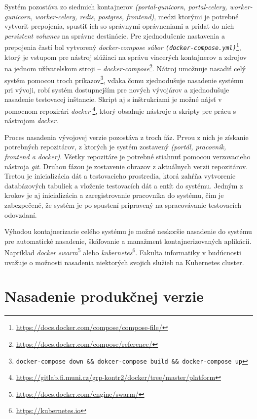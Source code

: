 \documentclass[
  digital, %
  twoside, %
  table,   %
  lof,     %
  lot,     %
]{fithesis3}
\begin{document}
Systém pozostáva zo siedmich kontajnerov \emph{(portal-gunicorn, portal-celery, worker-gunicorn, worker-celery, redis, postgres, frontend)}, medzi ktorými je potrebné vytvoriť prepojenia, spustiť ich so správnymi oprávneniami a pridať do nich \emph{persistent volumes} na správne destinácie. Pre zjednodušenie nastavenia a prepojenia častí bol vytvorený \emph{docker-compose súbor \texttt{(docker-compose.yml)}}\footnote{\url{https://docs.docker.com/compose/compose-file/}}, ktorý je vstupom pre nástroj slúžiaci na správu viacerých kontajnerov a zdrojov na jednom užívatelskom stroji -- \emph{docker-compose}\footnote{\url{https://docs.docker.com/compose/reference/}}. Nátroj umožnuje nasadiť celý systém pomocou troch príkazov\footnote{\texttt{docker-compose down \&\& dokcer-compose build \&\& docker-compose up}}, vďaka čomu zjednodušuje nasadenie systému pri vývoji, robí systém dostupnejším pre nových vývojárov a zjednodušuje nasadenie testovacej inštancie. Skript aj s inštrukciami je možné nájsť v pomocnom repozirári \emph{docker} \footnote{\url{https://gitlab.fi.muni.cz/grp-kontr2/docker/tree/master/platform}}, ktorý obsahuje nástroje a skripty pre prácu s nástrojom \emph{docker}.

Proces nasadenia vývojovej verzie pozostáva z troch fáz. Prvou z nich je získanie potrebných repozitárov, z ktorých je systém zostavený \emph{(portál, pracovník, frontend a docker)}. Všetky repozitáre je potrebné stiahnuť pomocou verzovacieho nástroja \emph{git}. Druhou fázou je zostavenie obrazov z aktuálnych verzii repozitárov. Tretou je inicializácia dát a testovacieho prostredia, ktorá zahŕňa vytvorenie databázových tabuliek a vloženie testovacích dát a entít do systému. Jedným z krokov je aj inicializácia a zaregistrovanie pracovníka do systému, čim je zabezpečené, že systém je po spustení pripravený na spracovávanie testovacích odovzdaní.

Výhodou kontajnerizacie celého systému je možné neskoršie nasadenie do systému pre automatické nasadenie, škáľovanie a manažment kontajnerizovaných aplikácii. Napríklad \emph{docker swarm}\footnote{\url{https://docs.docker.com/engine/swarm/}} alebo \emph{kubernetes}\footnote{\url{https://kubernetes.io}}. Fakulta informatiky v budúcnosti uvažuje o možnosti nasadenia niektorých svojich služieb na Kubernetes cluster.


\section{Nasadenie produkčnej verzie}
\end{document}
